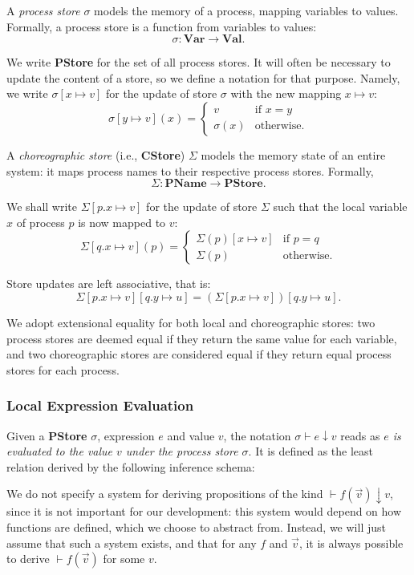 \documentclass[12pt,a4paper,twoside]{book}
\begin{document}
A \textit{process store} $\sigma$ models the memory of a process, mapping variables to values. Formally, a process store is a function from variables to values:
\[
\sigma : \textbf{Var} \longrightarrow \textbf{Val}.
\]

We write \textbf{PStore} for the set of all process stores. It will often be necessary to update the content of a store, so we define a notation for that purpose. Namely, we write $\sigma[x \mapsto v]$ for the update of store $\sigma$ with the new mapping $x \mapsto v$:
\[
\sigma[y \mapsto v](x) =
\begin{cases}
v & \text{if } x = y \\
\sigma(x) & \text{otherwise}.
\end{cases}
\]

A \textit{choreographic store} (i.e., \textbf{CStore}) $\Sigma$ models the memory state of an entire system: it maps process names to their respective process stores. Formally,
\[
\Sigma : \textbf{PName} \longrightarrow \textbf{PStore}.
\]

We shall write $\Sigma[p.x \mapsto v]$ for the update of store $\Sigma$ such that the local variable $x$ of process $p$ is now mapped to $v$:
\[
\Sigma[q.x \mapsto v](p) =
\begin{cases}
\Sigma(p)[x \mapsto v] & \text{if } p = q \\
\Sigma(p) & \text{otherwise}.
\end{cases}
\]

Store updates are left associative, that is:
\[
\Sigma[p.x \mapsto v][q.y \mapsto u] = (\Sigma[p.x \mapsto v])[q.y \mapsto u].
\]

We adopt extensional equality for both local and choreographic stores: two process stores are deemed equal if they return the same value for each variable, and two choreographic stores are considered equal if they return equal process stores for each process.

\subsubsection{Local Expression Evaluation}
Given a \textbf{PStore} $\sigma$, expression $e$ and value $v$, the notation $\sigma \vdash e \downarrow v$ reads as \textit{$e$ is evaluated to the value $v$ under the process store $\sigma$}. It is defined as the least relation derived by the following inference schema:
We do not specify a system for deriving propositions of the kind $\vdash f(\vec{v}) \downarrow v$, since it is not
important for our development: this system would depend on how functions are defined, which
we choose to abstract from. Instead, we will just assume that such a system exists, and that for
any $f$ and $\vec{v}$, it is always possible to derive $\vdash f(\vec{v})$ for some $v$.
\end{document}
